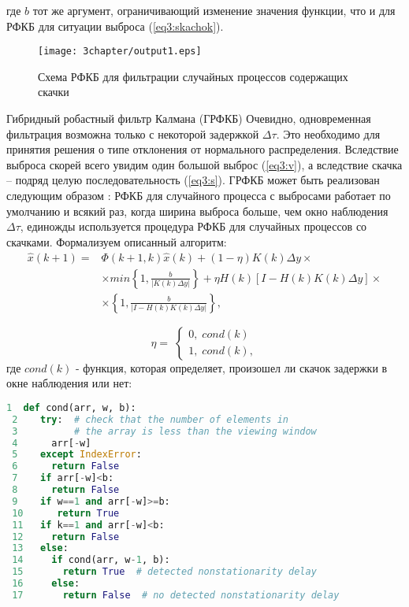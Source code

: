 \noindent где $b$ тот же аргумент, ограничивающий изменение значения функции, что и для РФКБ для ситуации выброса (\ref{eq3:skachok}).


\begin{figure} [h]
  \center
\texttt{[image: 3chapter/output1.eps]}
  \caption{Схема РФКБ для фильтрации случайных процессов содержащих скачки}
  \label{img3:kalmanS}
\end{figure}

Гибридный робастный фильтр Калмана (ГРФКБ)
Очевидно, одновременная фильтрация возможна только с некоторой задержкой $\Delta \tau$. 
Это необходимо для принятия решения о типе отклонения от нормального распределения. 
Вследствие выброса скорей всего увидим один большой выброс (\ref{eq3:v}), а вследствие скачка – подряд целую последовательность (\ref{eq3:s}). 
ГРФКБ может быть реализован следующим образом \cite{RobustFilter}: РФКБ для случайного процесса с выбросами работает по умолчанию и всякий раз, когда ширина выброса больше, чем окно наблюдения $\Delta \tau$, единожды используется процедура РФКБ для случайных процессов со скачками.
Формализуем описанный алгоритм:
\begin{equation}\label{eq3:syntes1}
\begin{split}
\hat{x}(k+1)=&\Phi(k+1,k)\hat{x}(k)+(1-\eta)K(k)\Delta y\times \\
&\times min\left\{1,\frac{b}{|K(k)\Delta y|}\right\}+\eta H(k)[I-H(k)K(k)\Delta y] \times\\
&\times\left\{1,\frac{b}{|I-H(k)K(k)\Delta y|}\right\},
\end{split}
\end{equation}

\begin{equation}\label{eq3:syntes2}
\eta= \;
\begin{cases}
0, \; cond(k) \\    
1, \; cond(k),    
\end{cases}
\end{equation}
\noindent где $cond(k)$ - функция, которая определяет, произошел ли скачок задержки в окне наблюдения или нет:
\begin{lstlisting}[language=Python]
 1  def cond(arr, w, b):  
 2    try:  # check that the number of elements in
 3          # the array is less than the viewing window
 4      arr[-w] 
 5    except IndexError:
 6      return False
 7    if arr[-w]<b:
 8      return False
 9    if w==1 and arr[-w]>=b:
 10      return True
 11   if k==1 and arr[-w]<b:
 12     return False
 13   else:
 14     if cond(arr, w-1, b):
 15       return True  # detected nonstationarity delay
 16     else:
 17       return False  # no detected nonstationarity delay
\end{lstlisting}



